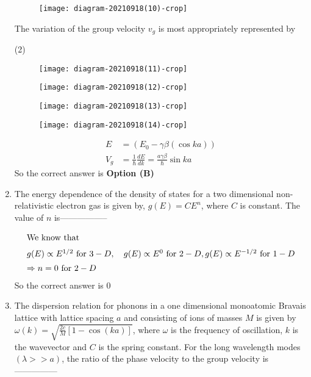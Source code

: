 \begin{enumerate}
	\begin{figure}[H]
		\centering
		\texttt{[image: diagram-20210918(10)-crop]}
	\end{figure}
	The variation of the group velocity $v_{g}$ is most appropriately represented by
	{	}
	\begin{tasks}(2)
		\task[\textbf{A.}] \begin{figure}[H]
			\centering
			\texttt{[image: diagram-20210918(11)-crop]}
		\end{figure}
		\task[\textbf{B.}] \begin{figure}[H]
			\centering
			\texttt{[image: diagram-20210918(12)-crop]}
		\end{figure}
		\task[\textbf{C.}] \begin{figure}[H]
			\centering
			\texttt{[image: diagram-20210918(13)-crop]}
		\end{figure}
		\task[\textbf{D.}] \begin{figure}[H]
			\centering
			\texttt{[image: diagram-20210918(14)-crop]}
		\end{figure}
	\end{tasks}
	\begin{answer}
		\begin{align*}
		E&=\left(E_{0}-\gamma \beta(\cos k a)\right)\\
		V_{g}&=\frac{1}{\hbar} \frac{d E}{d k}=\frac{a \gamma \beta}{\hbar} \sin k a
		\end{align*}
		So the correct answer is \textbf{Option (B)}
	\end{answer}
	\item The energy dependence of the density of states for a two dimensional non-relativistic electron gas is given by, $g(E)=C E^{n}$, where $C$ is constant. The value of $n$ is-----------------
	{	}
	\begin{answer}
		\begin{align*}
		\intertext{We know that}
		\intertext{$g(E) \propto E^{1 / 2}$ for $3-D, \quad g(E) \propto E^{0}$ for $2-D, g(E) \propto E^{-1 / 2}$ for $1-D$}
		\Rightarrow n&=0\text{ for }2-D
		\end{align*}
		So the correct answer is $0$
	\end{answer}
	\item The dispersion relation for phonons in a one dimensional monoatomic Bravais lattice with lattice spacing $a$ and consisting of ions of masses $M$ is given by $\omega(k)=\sqrt{\frac{2 c}{M}[1-\cos (k a)]}$, where $\omega$ is the frequency of oscillation, $k$ is the wavevector and $C$ is the spring constant. For the long wavelength modes $(\lambda>>a)$, the ratio of the phase velocity to the group velocity is---------------

\end{enumerate}
